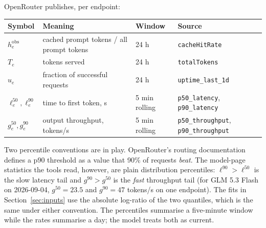 \documentclass[11pt]{article}
\begin{document}
OpenRouter publishes, per endpoint:
\begin{center}\small
\begin{tabular}{@{}llll@{}}
\toprule
Symbol & Meaning & Window & Source \\
\midrule
$h^{\text{obs}}_e$ & cached prompt tokens / all prompt tokens & 24 h & \texttt{cacheHitRate} \\
$T_e$ & tokens served & 24 h & \texttt{totalTokens} \\
$u_e$ & fraction of successful requests & 24 h & \texttt{uptime\_last\_1d} \\
$\ell^{50}_e, \ell^{90}_e$ & time to first token, s & 5 min rolling & \texttt{p50\_latency}, \texttt{p90\_latency} \\
$g^{50}_e, g^{90}_e$ & output throughput, tokens/s & 5 min rolling & \texttt{p50\_throughput}, \texttt{p90\_throughput} \\
\bottomrule
\end{tabular}
\end{center}
Two percentile conventions are in play. OpenRouter's routing documentation
defines a p90 threshold as a value that 90\% of requests \emph{beat}. The
model-page statistics the tools read, however, are plain distribution
percentiles: $\ell^{90} > \ell^{50}$ is the slow latency tail and
$g^{90} > g^{50}$ is the \emph{fast} throughput tail (for GLM 5.3 Flash on
2026-09-04, $g^{50} = 23.5$ and $g^{90} = 47$ tokens/s on one endpoint). The
fits in Section~\ref{sec:inputs} use the absolute log-ratio of the two
quantiles, which is the same under either convention. The percentiles summarise
a five-minute window while the rates summarise a day; the model treats both as
current.
\end{document}
